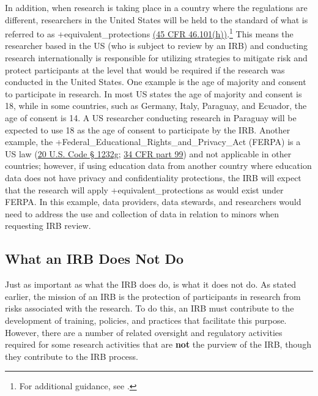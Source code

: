 \documentclass[
]{WileySix}
\begin{document}
In addition, when research is taking place in a country where the regulations are different, researchers in the United States will be held to the standard of what is referred to as +equivalent\_protections\textbar{} \href{https://www.law.cornell.edu/cfr/text/45/46.101}{(45 CFR 46.101(h))}.\footnote{For additional guidance, see \citet{officeforhumanresearchprotections2016a}.} This means the researcher based in the US (who is subject to review by an IRB) and conducting research internationally is responsible for utilizing strategies to mitigate risk and protect participants at the level that would be required if the research was conducted in the United States. One example is the age of majority and consent to participate in research. In most US states the age of majority and consent is 18, while in some countries, such as Germany, Italy, Paraguay, and Ecuador, the age of consent is 14. A US researcher conducting research in Paraguay will be expected to use 18 as the age of consent to participate by the IRB. Another example, the +Federal\_Educational\_Rights\_and\_Privacy\_Act\textbar{} (FERPA) is a US law (\href{https://www.law.cornell.edu/uscode/text/20/1232g}{20 U.S. Code § 1232g}; \href{https://www.law.cornell.edu/cfr/text/34/part-99}{34 CFR part 99}) and not applicable in other countries; however, if using education data from another country where education data does not have privacy and confidentiality protections, the IRB will expect that the research will apply +equivalent\_protections\textbar{} as would exist under FERPA. In this example, data providers, data stewards, and researchers would need to address the use and collection of data in relation to minors when requesting IRB review.

\hypertarget{what-an-irb-does-not-do}{%
\subsection{What an IRB Does Not Do}\label{what-an-irb-does-not-do}}

Just as important as what the IRB does do, is what it does not do. As stated earlier, the mission of an IRB is the protection of participants in research from risks associated with the research. To do this, an IRB must contribute to the development of training, policies, and practices that facilitate this purpose. However, there are a number of related oversight and regulatory activities required for some research activities that are \textbf{not} the purview of the IRB, though they contribute to the IRB process.
\end{document}
